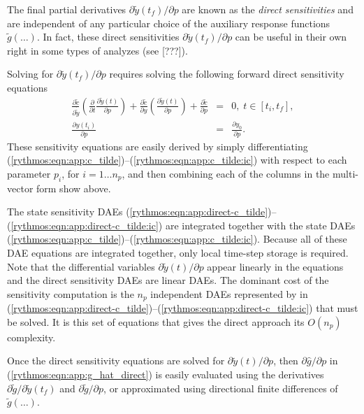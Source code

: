 \documentclass[pdf,ps2pdf,11pt]{SANDreport}
\begin{document}
The final partial derivatives $\partial \tilde{y}(t_f) / {}\partial p$ are
known as the {}\textit{direct sensitivities} and are independent of any
particular choice of the auxiliary response functions $\tilde{g}(\ldots)$.
In fact, these direct sensitivities $\partial \tilde{y}(t_f) / {}\partial p$
can be useful in their own right in some types of analyzes (see [???]).

Solving for $\partial \tilde{y}(t_f) / {}\partial p$ requires solving the
following forward direct sensitivity equations
%
\begin{eqnarray}
%
\frac{\partial \tilde{c}}{\partial \dot{\tilde{y}}} \left(\frac{\partial}{\partial t} \frac{\partial \tilde{y}(t)}{\partial p} \right)
+ \frac{\partial \tilde{c}}{\partial y} \left(\frac{\partial \tilde{y}(t)}{\partial p}\right)
+ \frac{\partial \tilde{c}}{\partial p} & = & 0, \; t \in \left[ t_i, t_f \right], \label{rythmos:eqn:app:direct-c_tilde} \\
\frac{\partial y(t_i)}{\partial p} & = & \frac{\partial y_0}{\partial p}. \label{rythmos:eqn:app:direct-c_tilde:ic}
\end{eqnarray}
%
These sensitivity equations are easily derived by simply differentiating
(\ref{rythmos:eqn:app:c_tilde})--(\ref{rythmos:eqn:app:c_tilde:ic}) with
respect to each parameter $p_i$, for $i = 1 {}\ldots n_p$, and then combining
each of the columns in the multi-vector form show above.

The state sensitivity DAEs
(\ref{rythmos:eqn:app:direct-c_tilde})--(\ref{rythmos:eqn:app:direct-c_tilde:ic})
are integrated together with the state DAEs
(\ref{rythmos:eqn:app:c_tilde})--(\ref{rythmos:eqn:app:c_tilde:ic}).  Because
all of these DAE equations are integrated together, only local time-step
storage is required.  Note that the differential variables ${}\partial
\tilde{y}(t) / {}\partial p$ appear linearly in the equations and the
direct sensitivity DAEs are linear DAEs.  The dominant cost of the sensitivity
computation is the $n_p$ independent DAEs represented by in
(\ref{rythmos:eqn:app:direct-c_tilde})--(\ref{rythmos:eqn:app:direct-c_tilde:ic})
that must be solved.  It is this set of equations that gives the direct
approach its $O(n_p)$ complexity.

Once the direct sensitivity equations are solved for ${}\partial \tilde{y}(t)
/ {}\partial p$, then $\partial {}\hat{g} / {}\partial p$ in
(\ref{rythmos:eqn:app:g_hat_direct}) is easily evaluated using the derivatives
$\partial \tilde{g} / {}\partial \tilde{y}(t_f)$ and $\partial \tilde{g} /
{}\partial p$, or approximated using directional finite differences of
$\tilde{g}(\ldots)$.
\end{document}
